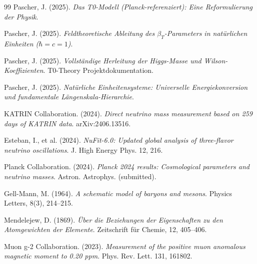 \begin{thebibliography}{99}
	Pascher, J. (2025). \textit{Das T0-Modell (Planck-referenziert): Eine Reformulierung der Physik}.  
	
	Pascher, J. (2025). \textit{Feldtheoretische Ableitung des $\beta_T$-Parameters in natürlichen Einheiten ($\hbar = c = 1$)}.  
	
	Pascher, J. (2025). \textit{Vollständige Herleitung der Higgs-Masse und Wilson-Koeffizienten}. T0-Theory Projektdokumentation.
	
	Pascher, J. (2025). \textit{Natürliche Einheitensysteme: Universelle Energiekonversion und fundamentale Längenskala-Hierarchie}.  
	
	KATRIN Collaboration. (2024). \textit{Direct neutrino mass measurement based on 259 days of KATRIN data}. arXiv:2406.13516.
	
	Esteban, I., et al. (2024). \textit{NuFit-6.0: Updated global analysis of three-flavor neutrino oscillations}. J. High Energy Phys. 12, 216.
	
	Planck Collaboration. (2024). \textit{Planck 2024 results: Cosmological parameters and neutrino masses}. Astron. Astrophys. (submitted).
	
	Gell-Mann, M. (1964). \textit{A schematic model of baryons and mesons}. Physics Letters, 8(3), 214--215.
	
	Mendelejew, D. (1869). \textit{Über die Beziehungen der Eigenschaften zu den Atomgewichten der Elemente}. Zeitschrift für Chemie, 12, 405--406.
	
	Muon g-2 Collaboration. (2023). \textit{Measurement of the positive muon anomalous magnetic moment to 0.20 ppm}. Phys. Rev. Lett. 131, 161802.
	
\end{thebibliography}
